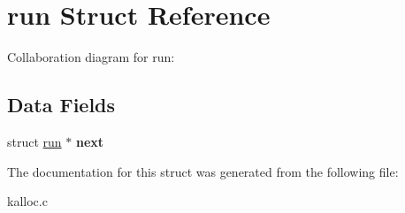 \hypertarget{structrun}{}\section{run Struct Reference}
\label{structrun}


Collaboration diagram for run\+:
\subsection*{Data Fields}
\begin{DoxyCompactItemize}
\item 
struct \hyperlink{structrun}{run} $\ast$ {\bfseries next}\hypertarget{structrun_a268099adb9e6c607cd814a421a1c8a18}{}\label{structrun_a268099adb9e6c607cd814a421a1c8a18}

\end{DoxyCompactItemize}


The documentation for this struct was generated from the following file\+:\begin{DoxyCompactItemize}
\item 
kalloc.\+c\end{DoxyCompactItemize}
